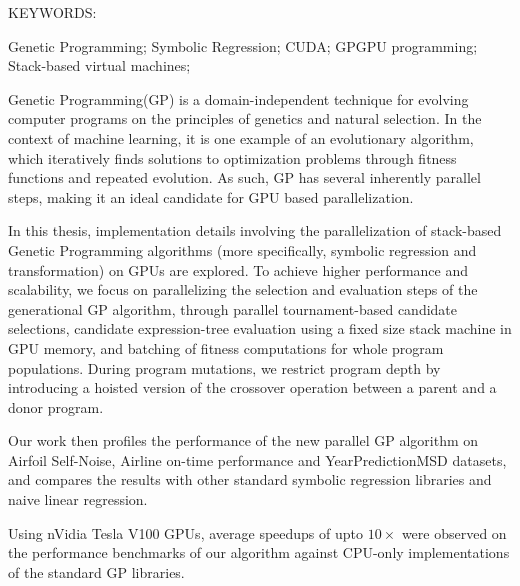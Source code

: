 \abstract

\noindent KEYWORDS: \hspace*{0.5em} 
\parbox[t]{4.4in}{  
  Genetic Programming;
	Symbolic Regression; 
  CUDA;
  GPGPU programming; 
  Stack-based virtual machines; 
}

\vspace*{24pt}

\noindent Genetic Programming(GP) is a domain-independent technique for evolving computer programs on the principles of genetics and natural selection. In the context of machine learning, it is one example of an evolutionary algorithm, which iteratively finds solutions to optimization problems through fitness functions and repeated evolution. As such, GP has several inherently parallel steps, making it an ideal candidate for GPU based parallelization. 

In this thesis, implementation details involving the parallelization of stack-based Genetic Programming algorithms (more specifically, symbolic regression and transformation) on GPUs are explored. To achieve higher performance and scalability, we focus on parallelizing the selection and evaluation steps of the generational GP algorithm, through parallel tournament-based candidate selections, candidate expression-tree evaluation using a fixed size stack machine in GPU memory, and batching of fitness computations for whole program populations. 
During program mutations, we restrict program depth by introducing a hoisted version of the crossover operation between a parent and a donor program. 

Our work then profiles the performance of the new parallel GP algorithm on Airfoil Self-Noise, Airline on-time performance and YearPredictionMSD datasets, and compares the results with other standard symbolic regression libraries and naive linear regression. 

Using nVidia Tesla V100 GPUs, average speedups of upto $10 \times$ were observed on the performance benchmarks of our algorithm against CPU-only implementations of the standard GP libraries.
